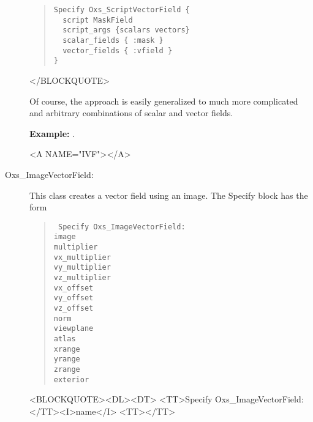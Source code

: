 \begin{description}
\begin{quote}
\begin{verbatim}
Specify Oxs_ScriptVectorField {
  script MaskField
  script_args {scalars vectors}
  scalar_fields { :mask }
  vector_fields { :vfield }
}
\end{verbatim}
\end{quote}
\begin{rawhtml}</BLOCKQUOTE>\end{rawhtml}
Of course, the  approach is easily
generalized to much more complicated and arbitrary combinations of
scalar and vector fields.

\textbf{Example:} .

\begin{rawhtml}<A NAME="IVF"></A>\end{rawhtml}%
%
\item[Oxs\_ImageVectorField:\label{item:ImageVectorField}]
This class creates a vector field using an image.  The Specify block has
the form
\begin{latexonly}
\begin{quote}\tt
Specify Oxs\_ImageVectorField: \ocb\\
 \bi image \\
 \bi multiplier \\
 \bi vx\_multiplier \\
 \bi vy\_multiplier \\
 \bi vz\_multiplier \\
 \bi vx\_offset \\
 \bi vy\_offset \\
 \bi vz\_offset \\
 \bi norm \\
 \bi viewplane \\
 \bi atlas \\
 \bi xrange \ocb{}\ccb\\
 \bi yrange \ocb{}\ccb\\
 \bi zrange \ocb{}\ccb\\
 \bi exterior \\
\ccb
\end{quote}
\end{latexonly}
\begin{rawhtml}<BLOCKQUOTE><DL><DT>
<TT>Specify Oxs_ImageVectorField:</TT><I>name</I> <TT>{</TT>
}
\end{rawhtml}
\end{description}

